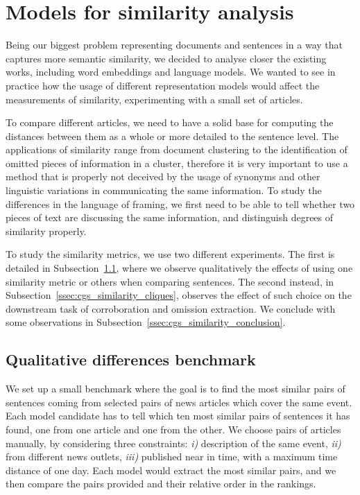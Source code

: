 \section{\statusgreen Models for similarity analysis}
\label{sec:cgs_similarity}
Being our biggest problem representing documents and sentences in a way that captures more semantic similarity, we decided to analyse closer the existing works, including word embeddings and language models.
We wanted to see in practice how the usage of different representation models would affect the measurements of similarity, experimenting with a small set of articles. 

To compare different articles, we need to have a
solid base for computing the distances between them as a whole or more detailed to the sentence level.
The applications of similarity range from document clustering to the identification of omitted pieces of information in a cluster, therefore it is very important to use a method that is properly not deceived by the usage of synonyms and other linguistic variations in communicating the same information. To study the differences in the language of framing, we first need to be able to tell whether two pieces of text are discussing the same information, and distinguish degrees of similarity properly.

To study the similarity metrics, we use two different experiments. The first is detailed in Subsection~\ref{ssec:cgs_similarity_qualitative}, where we observe qualitatively the effects of using one similarity metric or others when comparing sentences. The second instead, in Subsection~\ref{ssec:cgs_similarity_cliques}, observes the effect of such choice on the downstream task of corroboration and omission extraction.
We conclude with some observations in Subsection~\ref{ssec:cgs_similarity_conclusion}.


\subsection{\statusgreen Qualitative differences benchmark}
\label{ssec:cgs_similarity_qualitative}
We set up a small benchmark where the goal is to find the most similar pairs of sentences coming from selected pairs of news articles which cover the same event. Each model candidate has to tell which ten most similar pairs of sentences it has found, one from one article and one from the other.
We choose pairs of articles manually, %
by considering three constraints: \textit{i)} description of the same event, \textit{ii)} from different news outlets, \textit{iii)} published near in time, with a maximum time distance of one day.
Each model would extract the most similar pairs, and we then compare the pairs provided and their relative order in the rankings.

